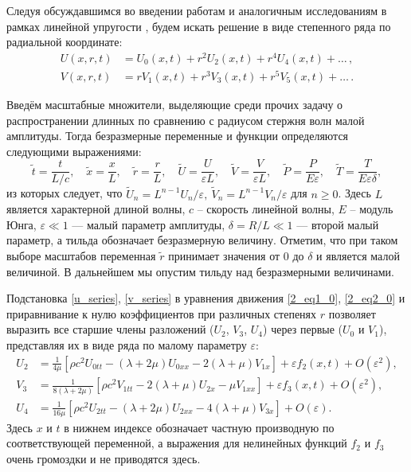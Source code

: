 \documentclass[12pt, a4paper]{article}
\begin{document}
Следуя обсуждавшимся во введении работам и аналогичным исследованиям в рамках линейной упругости \cite{bostrm2000}, будем искать решение в виде степенного ряда по радиальной координате:
\begin{align}
\label{u_series}
U(x,r,t) &= U_0(x,t) + r^2 U_2(x,t) + r^4 U_4(x,t) + \dots \, ,\\
\label{v_series}
V(x,r,t) &= r V_1(x,t) + r^3 V_3(x,t) + r^5 V_5(x,t) + \dots \, .
\end{align}

Введём масштабные множители, выделяющие среди прочих задачу о распространении длинных по сравнению с радиусом стержня волн малой амплитуды. Тогда безразмерные переменные и функции определяются следующими выражениями:
\begin{equation} \label{scales1}
\tilde t = \frac{t}{L/c}, \quad \tilde x = \frac{x}{L}, \quad \tilde r = \frac{r}{L}, \quad \tilde U = \frac{U}{\varepsilon L}, \quad \tilde V = \frac{V}{\varepsilon L}, \quad \tilde P = \frac{P}{E \varepsilon}, \quad \tilde T = \frac{T}{E \varepsilon\delta},
\end{equation}
из которых следует, что
$\tilde U_n = L^{n-1} U_n/\varepsilon, \ \tilde V_n =  L^{n-1} V_n/\varepsilon$ для $n \geqslant 0$.
Здесь $L$ является характерной длиной волны, $c$ -- скорость линейной волны, $E$ -- модуль Юнга, $\varepsilon \ll 1$ --- малый параметр амплитуды, $\displaystyle \delta = R/L \ll 1$ --- второй малый параметр, а тильда обозначает безразмерную величину. Отметим, что при таком выборе масштабов переменная $\tilde r$ принимает значения от $0$ до $\delta$ и является малой величиной.
В дальнейшем мы опустим тильду над безразмерными величинами.

Подстановка \eqref{u_series}, \eqref{v_series} в уравнения движения \eqref{2_eq1_0}, \eqref{2_eq2_0} и приравнивание к нулю коэффициентов при различных степенях $r$ позволяет выразить все старшие члены разложений ($U_2$, $V_3$, $U_4$) через первые ($U_0$ и $V_1$), представляя их в виде ряда по малому параметру $\varepsilon$:
\begin{align}
\label{U2}
U_2 &= \frac{1}{4\mu} \left[ \rho c^2 U_{0tt} - (\lambda + 2\mu) U_{0xx} - 2(\lambda + \mu) V_{1x} \right] + \varepsilon f_2(x,t) + O(\varepsilon^2),\\
\label{V3}
V_3 &= \frac{1}{8(\lambda + 2\mu)} \left[ \rho c^2 V_{1tt} - 2(\lambda + \mu) U_{2x} - \mu V_{1xx} \right] + \varepsilon f_3(x,t) + O(\varepsilon^2),\\
\label{U4}
U_4 &= \frac{1}{16\mu}\left[\rho c^2 U_{2tt} - (\lambda + 2\mu) U_{2xx} - 4(\lambda + \mu) V_{3x}\right] + O(\varepsilon).
\end{align}
Здесь $x$ и $t$ в нижнем индексе обозначает частную производную по соответствующей переменной, а выражения для нелинейных функций $f_2$ и $f_3$ очень громоздки и не приводятся здесь.
\end{document}
